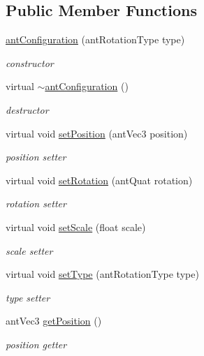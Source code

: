\subsection*{Public Member Functions}
\begin{DoxyCompactItemize}
\item 
\hyperlink{classant_configuration_a572b780d41fcc29ba89f8f43a719f1ae}{ant\+Configuration} (ant\+Rotation\+Type type)
\begin{DoxyCompactList}\small\item\em constructor \end{DoxyCompactList}\item 
virtual \hyperlink{classant_configuration_a76b24fe6a1488ac3d53bcb3292de9e41}{$\sim$ant\+Configuration} ()
\begin{DoxyCompactList}\small\item\em destructor \end{DoxyCompactList}\item 
virtual void \hyperlink{classant_configuration_af9a9ea5087d5179ebc2ff526a33a33e7}{set\+Position} (ant\+Vec3 position)
\begin{DoxyCompactList}\small\item\em position setter \end{DoxyCompactList}\item 
virtual void \hyperlink{classant_configuration_aef07bf707197372ffa3b454d0fa01b81}{set\+Rotation} (ant\+Quat rotation)
\begin{DoxyCompactList}\small\item\em rotation setter \end{DoxyCompactList}\item 
virtual void \hyperlink{classant_configuration_a85eb7a1ce3ad32a006aaae9a7b4d8991}{set\+Scale} (float scale)
\begin{DoxyCompactList}\small\item\em scale setter \end{DoxyCompactList}\item 
virtual void \hyperlink{classant_configuration_acb6ac97d627d528f5c3dbd5d7ef124b5}{set\+Type} (ant\+Rotation\+Type type)
\begin{DoxyCompactList}\small\item\em type setter \end{DoxyCompactList}\item 
ant\+Vec3 \hyperlink{classant_configuration_a4e178bdbab92eb1438b27d09a61bd2f3}{get\+Position} ()
\begin{DoxyCompactList}\small\item\em position getter \end{DoxyCompactList}\item 

\end{DoxyCompactItemize}
